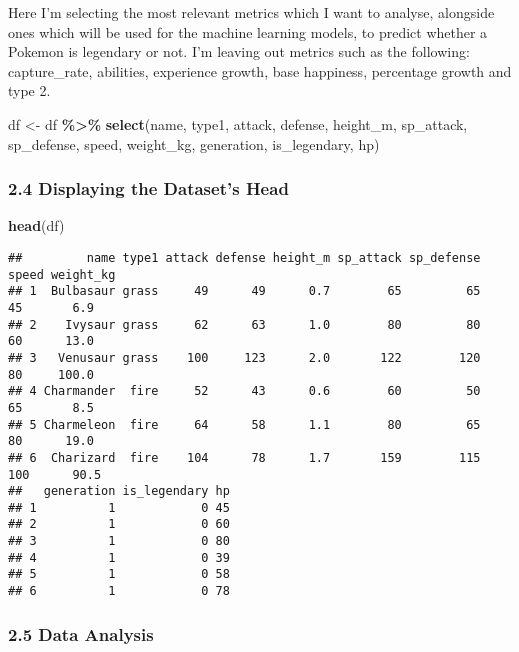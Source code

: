 \documentclass[
]{article}
\newenvironment{Shaded}{\begin{snugshade}}{\end{snugshade}}
\newcommand{\FunctionTok}[1]{\textcolor[rgb]{0.13,0.29,0.53}{\textbf{#1}}}
\newcommand{\NormalTok}[1]{#1}
\newcommand{\OtherTok}[1]{\textcolor[rgb]{0.56,0.35,0.01}{#1}}
\newcommand{\SpecialCharTok}[1]{\textcolor[rgb]{0.81,0.36,0.00}{\textbf{#1}}}
\begin{document}
Here I'm selecting the most relevant metrics which I want to analyse,
alongside ones which will be used for the machine learning models, to
predict whether a Pokemon is legendary or not. I'm leaving out metrics
such as the following: capture\_rate, abilities, experience growth, base
happiness, percentage growth and type 2.

\begin{Shaded}
\begin{Highlighting}[]
\NormalTok{df }\OtherTok{\textless{}{-}}\NormalTok{ df }\SpecialCharTok{\%\textgreater{}\%}
  \FunctionTok{select}\NormalTok{(name, type1, attack, defense, height\_m, sp\_attack, sp\_defense, speed, weight\_kg, generation, is\_legendary, hp)}
\end{Highlighting}
\end{Shaded}

\subsubsection{2.4 Displaying the Dataset's
Head}\label{displaying-the-datasets-head}

\begin{Shaded}
\begin{Highlighting}[]
\FunctionTok{head}\NormalTok{(df)}
\end{Highlighting}
\end{Shaded}

\begin{verbatim}
##         name type1 attack defense height_m sp_attack sp_defense speed weight_kg
## 1  Bulbasaur grass     49      49      0.7        65         65    45       6.9
## 2    Ivysaur grass     62      63      1.0        80         80    60      13.0
## 3   Venusaur grass    100     123      2.0       122        120    80     100.0
## 4 Charmander  fire     52      43      0.6        60         50    65       8.5
## 5 Charmeleon  fire     64      58      1.1        80         65    80      19.0
## 6  Charizard  fire    104      78      1.7       159        115   100      90.5
##   generation is_legendary hp
## 1          1            0 45
## 2          1            0 60
## 3          1            0 80
## 4          1            0 39
## 5          1            0 58
## 6          1            0 78
\end{verbatim}

\subsubsection{2.5 Data Analysis}\label{data-analysis}
\end{document}

